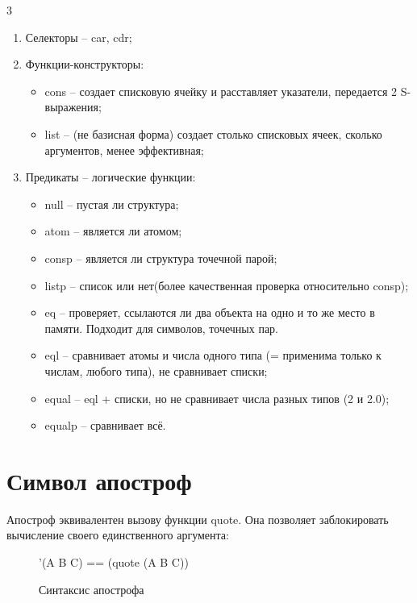 \begin{listbox}{\noindent \begin{listboxtitle}{}3\end{listboxtitle}}
\begin{enumerate}
    \item Селекторы -- car, cdr;
    \item Функции-конструкторы:
    \begin{itemize}[label=—]
        \item cons -- создает списковую ячейку и расставляет указатели, передается 
        2 S-выражения;
        \item list -- (не базисная форма) создает столько списковых ячеек, 
        сколько аргументов, менее эффективная;
    \end{itemize}
    \item Предикаты -- логические функции:
    \begin{itemize}[label=—]
        \item null -- пустая ли структура;
        \item atom -- является ли атомом;
        \item consp -- является ли структура точечной парой;
        \item listp -- список или нет(более качественная проверка относительно consp);
        \item eq -- проверяет, ссылаются ли два объекта на одно и то же место в памяти. Подходит для символов, точечных пар.
        \item eql -- сравнивает атомы и числа одного типа (= применима только к числам, любого типа), не сравнивает списки;
        \item equal -- eql + списки, но не сравнивает числа разных типов (2 и 2.0);
        \item equalp -- сравнивает всё.
    \end{itemize}
\end{enumerate}
\end{listbox}

\section{Символ апостроф}

Апостроф эквивалентен вызову функции quote. Она позволяет заблокировать 
вычисление своего единственного аргумента:

\begin{figure}[H]
    \begin{listingbox}{}
        '(A B C) == (quote (A B C))
    \end{listingbox}
    \caption{Синтаксис апострофа}
\end{figure}

